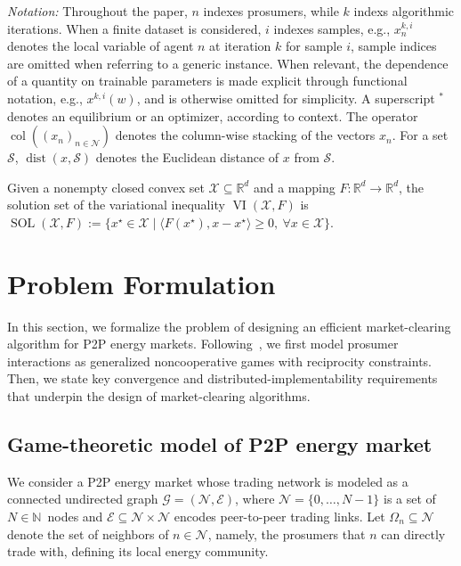 \documentclass[final]{l4dc2026}
\begin{document}
\medskip
\emph{Notation:} Throughout the paper, $n$ indexes prosumers, while $k$ indexs algorithmic iterations. When a finite dataset is considered, $i$ indexes samples, e.g., $x_n^{k,i}$ denotes the local variable of agent $n$ at iteration $k$ for sample $i$, sample indices are omitted when referring to a generic instance. When relevant, the dependence of a quantity on trainable parameters is made explicit through functional notation, e.g., $x^{k,i}(w)$, and is otherwise omitted for simplicity. A superscript $^*$ denotes an equilibrium or an optimizer, according to context. The operator $\operatorname{col}((x_n)_{n\in\mathcal N})$ denotes the column-wise stacking of the vectors $x_n$. For a set $\mathcal S$, $\operatorname{dist}(x,\mathcal S)$ denotes the Euclidean distance of $x$ from $\mathcal S$.

Given a nonempty closed convex set $\mathcal X\subseteq\mathbb R^d$ and a mapping $F:\mathbb R^d\to\mathbb R^d$, the solution set of the variational inequality $\operatorname{VI}(\mathcal X,F)$ is
$\operatorname{SOL}(\mathcal X,F):=\{x^\star\in\mathcal X\mid\langle F(x^\star),x-x^\star\rangle\geq 0,\ \forall x\in\mathcal X\}$.




\section{Problem Formulation}
\label{sec:probformulation}
In this section, we formalize the problem of designing an efficient market-clearing algorithm for P2P energy markets. Following~\citep{cadre_peer-peer_2020}, we first model prosumer interactions as generalized noncooperative games with reciprocity constraints. Then, we state key convergence and distributed-implementability requirements that underpin the design of market-clearing algorithms.

\subsection{Game-theoretic model of P2P energy market}
We consider a P2P energy market whose trading network is modeled as a connected undirected graph $\mathcal{G} = (\mathcal{N}, \mathcal{E})$, where
$\mathcal{N} = \{0, \ldots, N{-}1\}$ is a set of $N \in \mathbb{N}$~nodes
and $\mathcal{E} \subseteq \mathcal{N} \times \mathcal{N}$
encodes peer-to-peer trading links.
Let $\Omega_n \subseteq \mathcal{N}$ denote the set of neighbors of $n\in\mathcal{N}$, namely, the prosumers that $n$ can directly
trade with, defining its local energy community.
\end{document}

